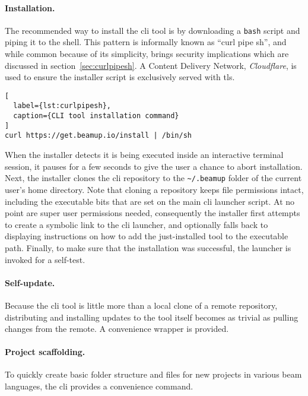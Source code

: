 \paragraph{Installation.} The recommended way to install the \acrshort{cli} tool is by downloading a \lstinline|bash| script and piping it to the shell. This pattern is informally known as ``curl pipe sh'', and while common because of its simplicity, brings security implications which are discussed in section~\ref{sec:curlpipesh}. A Content Delivery Network, \emph{Cloudflare}, is used to ensure the installer script is exclusively served with \acrfull{tls}.

\begin{lstlisting}[
  label={lst:curlpipesh},
  caption={CLI tool installation command}
]
curl https://get.beamup.io/install | /bin/sh
\end{lstlisting}

When the installer detects it is being executed inside an interactive terminal session, it pauses for a few seconds to give the user a chance to abort installation. Next, the installer clones the \acrshort{cli} repository to the \lstinline|~/.beamup| folder of the current user's home directory. Note that cloning a repository keeps file permissions intact, including the executable bits that are set on the main \acrshort{cli} launcher script. At no point are super user permissions needed, consequently the installer first attempts to create a symbolic link to the \acrshort{cli} launcher, and optionally falls back to displaying instructions on how to add the just-installed tool to the executable path. Finally, to make sure that the installation was successful, the launcher is invoked for a self-test.

\paragraph{Self-update.} Because the \acrshort{cli} tool is little more than a local clone of a remote repository, distributing and installing updates to the tool itself becomes as trivial as pulling changes from the remote. A convenience wrapper is provided.

\paragraph{Project scaffolding.} To quickly create basic folder structure and files for new projects in various \acrshort{beam} languages, the \acrshort{cli} provides a convenience command.

